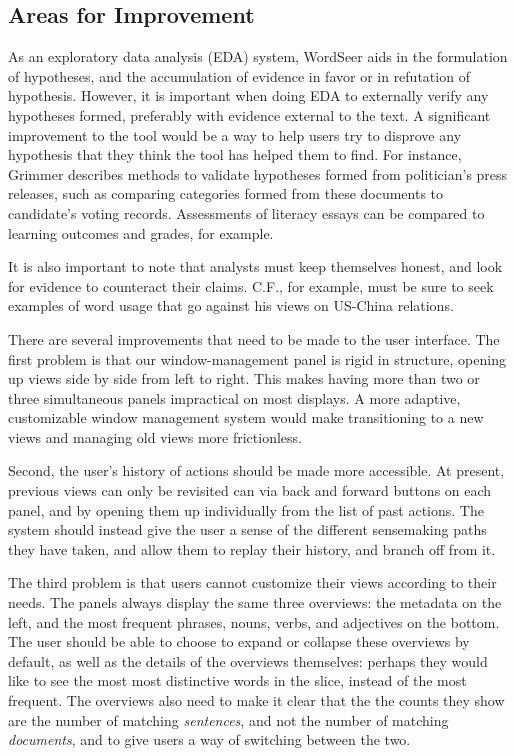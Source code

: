 \subsection{Areas for Improvement}
As an exploratory data analysis (EDA) system, WordSeer aids in the formulation of hypotheses, and the accumulation of evidence in favor or in refutation of hypothesis. However, it is important when doing EDA to externally verify any hypotheses formed, preferably with evidence external to the text.   A significant improvement to the tool would be a way to help users try to disprove any hypothesis that they think the tool has helped them to find. For instance, Grimmer \cite{grimmer} describes methods to validate hypotheses formed from politician's press releases, such as comparing categories formed from these documents to candidate's voting records.  Assessments of literacy essays can be compared to learning outcomes and grades, for example.  

It is also important to note that analysts must keep themselves honest, and look for evidence to counteract their claims. C.F., for example, must be sure to seek examples of word usage that go against his views on US-China relations. 

There are several improvements that need to be made to the user interface. The first problem is that our window-management panel is rigid in structure, opening up views side by side from left to right. This makes having more than two or three simultaneous panels impractical on most displays. A more adaptive, customizable window management system would make transitioning to a new views and managing old views more frictionless.

Second, the user's history of actions should be made more accessible. At present, previous views can only be revisited can via back and forward buttons on each panel, and by opening them up individually from the list of past actions. The system should instead give the user a sense of the different sensemaking paths they have taken, and allow them to replay their history, and branch off from it.

The third problem is that users cannot customize their views according to their needs. The panels always display the same three overviews: the metadata on the left, and the most frequent phrases, nouns, verbs, and adjectives on the bottom. The user should be able to choose to expand or collapse these overviews by default, as well as the details of the overviews themselves: perhaps they would like to see the most most distinctive words in the slice, instead of the most frequent. The overviews also need to make it clear that the the counts they show are the number of matching \emph{sentences}, and not the number of matching \emph{documents}, and to give users a way of switching between the two. 
 
